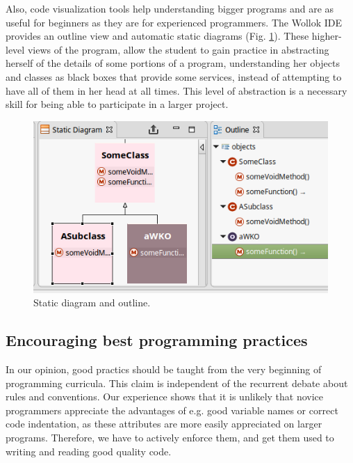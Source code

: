 Also, code visualization tools help understanding bigger programs and are as useful for beginners as they are for experienced programmers.
The Wollok IDE provides an outline view and automatic static diagrams (\cf Fig. \ref{fig:outline}).
These higher-level views of the program, allow the student to gain practice in abstracting herself of the details of some portions of a program, understanding her objects and classes as black boxes that provide some services, instead of attempting to have all of them in her head at all times. This level of abstraction is a necessary skill for being able to participate in a larger project.

\begin{figure}[ht]
 \centering
 \includegraphics[scale=0.5]{images/outline.png}
 \caption{\small Static diagram and outline.}
 \label{fig:outline}
\end{figure}



\subsection{Encouraging best programming practices}
In our opinion, good practics should be taught from the very beginning of programming curricula. This claim is independent of the recurrent debate about rules and conventions. 
Our experience shows that it is unlikely that novice programmers appreciate the advantages of e.g. good variable names or correct code indentation, as these attributes are more easily appreciated on larger programs.
Therefore, we have to actively enforce them, and get them used to writing and reading good quality code.

